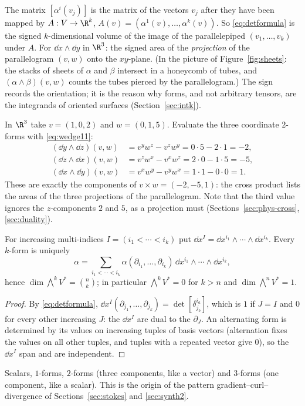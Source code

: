 \begin{intuition}
The matrix $[\alpha^i(v_j)]$ is the matrix of the vectors $v_j$ after they have been mapped by
$A:V\to\R^k$, $A(v)=(\alpha^1(v),\dots,\alpha^k(v))$. So \eqref{eq:detformula} is the signed $k$-dimensional volume of the image
of the parallelepiped $(v_1,\dots,v_k)$ under $A$. For $\dd x\wedge\dd y$ in $\R^3$: the signed area of the \emph{projection} of
the parallelogram $(v,w)$ onto the $xy$-plane. (In the picture of Figure~\ref{fig:sheets}: the stacks of sheets of $\alpha$ and
$\beta$ intersect in a honeycomb of tubes, and $(\alpha\wedge\beta)(v,w)$ counts the tubes pierced by the parallelogram.)
The sign records the orientation; it is the reason why forms, and not arbitrary tensors, are the integrands of oriented surfaces
(Section~\ref{sec:intk}).
\end{intuition}

\begin{example}\label{ex:projareas}
In $\R^3$ take $v=(1,0,2)$ and $w=(0,1,5)$. Evaluate the three coordinate $2$-forms with \eqref{eq:wedge11}:
\begin{align*}
(\dd y\wedge\dd z)(v,w)&=v^yw^z-v^zw^y=0\cdot5-2\cdot1=-2,\\
(\dd z\wedge\dd x)(v,w)&=v^zw^x-v^xw^z=2\cdot0-1\cdot5=-5,\\
(\dd x\wedge\dd y)(v,w)&=v^xw^y-v^yw^x=1\cdot1-0\cdot0=1.
\end{align*}
These are exactly the components of $v\times w=(-2,-5,1)$: the cross product lists the areas of the three projections of the
parallelogram. Note that the third value ignores the $z$-components $2$ and $5$, as a projection must
(Sections~\ref{sec:phys-cross}, \ref{sec:duality}).
\end{example}

\begin{proposition}\label{prop:formbasis}
For increasing multi-indices $I=(i_1<\cdots<i_k)$ put $\dd x^I=\dd x^{i_1}\wedge\cdots\wedge\dd x^{i_k}$. Every $k$-form is uniquely
\[
\alpha=\sum_{i_1<\cdots<i_k}\alpha(\partial_{i_1},\dots,\partial_{i_k})\,\dd x^{i_1}\wedge\cdots\wedge\dd x^{i_k},
\]
hence $\dim\bigwedge^kV^*=\binom nk$; in particular $\bigwedge^kV^*=0$ for $k>n$ and $\dim\bigwedge^nV^*=1$.
\end{proposition}
\begin{proof}
By \eqref{eq:detformula}, $\dd x^I(\partial_{j_1},\dots,\partial_{j_k})=\det[\delta^{i_a}_{j_b}]$, which is $1$ if $J=I$ and $0$ for every
other increasing $J$: the $\dd x^I$ are dual to the $\partial_J$. An alternating form is determined by its values on increasing
tuples of basis vectors (alternation fixes the values on all other tuples, and tuples with a repeated vector give $0$), so the
$\dd x^I$ span and are independent.
\end{proof}

\begin{specialcase}[$n=3$: dimensions $1,3,3,1$]
Scalars, $1$-forms, $2$-forms (three components, like a vector) and $3$-forms (one component, like a scalar). This is the origin of
the pattern gradient--curl--divergence of Sections~\ref{sec:stokes} and \ref{sec:synth2}.
\end{specialcase}
